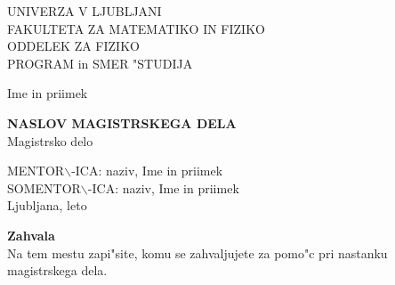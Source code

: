 \def\epsfg#1#2{\epsfig{file=#1.eps,width=#2}}
\def\legendamp#1#2{\vbox{\hsize=#1\caption{\small #2}}}

\setcounter{topnumber}{4}
\setcounter{bottomnumber}{4}
\setcounter{totalnumber}{5}
\renewcommand{\topfraction}{0.99}
\renewcommand{\bottomfraction}{0.99}
\renewcommand{\textfraction}{0.0}
\setlength{\tabcolsep}{10pt}
\renewcommand{\arraystretch}{1.5}

\def\bi#1{\hbox{\boldmath{$#1$}}}
\let\oldvec\vec
\def\vec#1{\mbox{\boldmath$#1$}}
\def\pol{{\textstyle{1\over2}}}
\def\svec#1{\mbox{{\scriptsize \boldmath$#1$}}}




\pagestyle{empty}
\begin{center}

{\large UNIVERZA V LJUBLJANI\\
FAKULTETA ZA MATEMATIKO IN FIZIKO\\
ODDELEK ZA FIZIKO\\
PROGRAM in SMER "STUDIJA\\}


\vspace{4cm}


{\Large Ime in priimek\\}

\vspace{10mm}

{\bf \Large NASLOV MAGISTRSKEGA DELA}\\
\vspace{5mm}
{\large Magistrsko delo}\\




\vfill



{\large MENTOR$\backslash$-ICA: naziv, Ime in priimek\\
SOMENTOR$\backslash$-ICA: naziv, Ime in priimek\\


\vspace{2cm}
Ljubljana, leto}

\end{center}


\cleardoublepage
\mbox{}
\vfill
{\Large \bf Zahvala}
\vspace{1cm}\\
Na tem mestu zapi"site, komu se zahvaljujete za pomo"c pri nastanku magistrskega dela.

